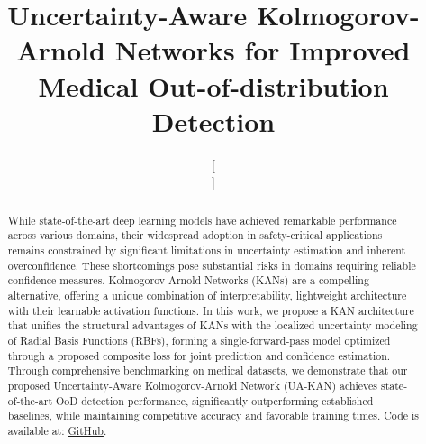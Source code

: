 \documentclass[conference]{IEEEtran}
\begin{document}
\title{Uncertainty-Aware Kolmogorov-Arnold Networks for Improved Medical Out-of-distribution Detection\\
}

\author{
\and
{}
\and
{}
\and[\hfill\mbox{}\par\mbox{}\hfill]
}

\maketitle

\begin{abstract}
While state-of-the-art deep learning models have achieved remarkable performance across various domains, their widespread adoption in safety-critical applications remains constrained by significant limitations in uncertainty estimation and inherent overconfidence. These shortcomings pose substantial risks in domains requiring reliable confidence measures. Kolmogorov-Arnold Networks (KANs) are a compelling alternative, offering a unique combination of interpretability, lightweight architecture with their learnable activation functions. In this work, we propose a KAN architecture that unifies the structural advantages of KANs with the localized uncertainty modeling of Radial Basis Functions (RBFs), forming a single-forward-pass model optimized through a proposed composite loss for joint prediction and confidence estimation. Through comprehensive benchmarking on medical datasets, we demonstrate that our proposed Uncertainty-Aware Kolmogorov-Arnold Network (UA-KAN) achieves state-of-the-art OoD detection performance, significantly outperforming established baselines, while maintaining competitive accuracy and favorable training times. Code is available at: \href{https://github.com/konthis/Uncertainty-Aware-KAN-for-OoD-detection}{GitHub}. 
\end{abstract}
\end{document}
